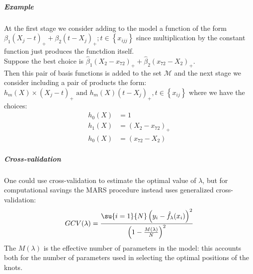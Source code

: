 \subparagraph{Example}
At the first stage we consider adding to the model a function of the form $\beta_{1}\left(X_{j}-t
\right)_{+}+\beta_{2}\left(t-X_{j}\right)_{+}; t\in\left\{x_{ijj}\right\}$ since multiplication by
the constant function just produces the functdion itself.\\
Suppose the best choice is $\hat{\beta}_{1}\left(X_{2}-x_{72}\right)_{+}+\hat{\beta}_{2}\left(x_{72}-X_{2}\right)_{+}$.\\
Then this pair of basis functions is added to the set $\mathcal{M}$ and the next stage we consider
including a pair of products the form:
$h_{m}(X)\times\left(X_{j}-t\right)_{+}\text{ and }h_{m}(X)\left(t-X_{j}\right)_{+}, t\in\left\{
x_{ij}\right\}$
where we have the choices:
\begin{align*}
	h_{0}(X) &= 1\\
	h_{1}(X) &= \left(X_{2}-x_{72}\right)_{+}\\
	h_{0}(X) &= \left( x_{72}-X_{2} \right)
\end{align*}

\subparagraph{Cross-validation}
One could use cross-validation to estimate the optimal value of $\lambda$, but for computational
savings the MARS procedure instead uses generalized cross-validation:
$$ GCV(\lambda) = \dfrac{\su{{i=1}}{N}\left(y_{i}-\hat{f}_{\lambda}(x_{i})\right)^{2}}{
\left(1-\frac{M(\lambda)}{N}\right)^{2}}$$
The $M(\lambda)$ is the effective number of parameters in the model: this accounts both for the
number of parameters used in selecting the optimal positions of the knots. 
